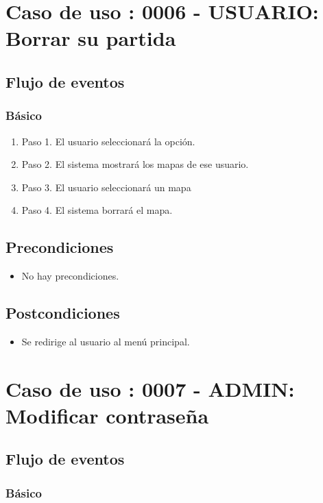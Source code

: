 \section{Caso de uso : 0006 - USUARIO: Borrar su partida}\label{sec:uc0}
\subsection{Flujo de eventos}
\subsubsection{Básico}

\begin{enumerate}
\item Paso 1.
El usuario seleccionará la opción.
\item Paso 2.
El sistema mostrará los mapas de ese usuario.
\item Paso 3.
El usuario seleccionará un mapa
\item Paso 4.
El sistema borrará el mapa.
\end{enumerate}

\subsection{Precondiciones}
\begin{itemize}
\item No hay precondiciones.
\end{itemize}

\subsection{Postcondiciones}
\begin{itemize}
\item Se redirige al usuario al menú principal.
\end{itemize}



\section{Caso de uso : 0007 - ADMIN: Modificar contraseña}\label{sec:uc0}
\subsection{Flujo de eventos}
\subsubsection{Básico}

